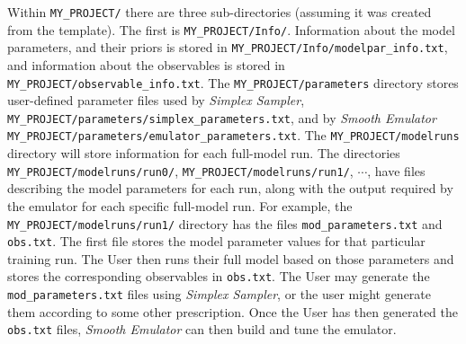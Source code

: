 \documentclass[UserManual.tex]{subfiles}
\begin{document}
Within {\tt MY\_PROJECT/} there are three sub-directories (assuming it was created from the template). The first is {\tt MY\_PROJECT/Info/}. Information about the model parameters, and their priors is stored in {\tt MY\_PROJECT/Info/modelpar\_info.txt}, and information about the observables is stored in {\tt MY\_PROJECT/observable\_info.txt}. The {\tt MY\_PROJECT/parameters} directory stores user-defined parameter files used by {\it Simplex Sampler}, {\tt MY\_PROJECT/parameters/simplex\_parameters.txt}, and by {\it Smooth Emulator} {\tt MY\_PROJECT/parameters/emulator\_parameters.txt}. The {\tt MY\_PROJECT/modelruns} directory will store information for each full-model run. The directories {\tt  MY\_PROJECT/modelruns/run0/}, {\tt  MY\_PROJECT/modelruns/run1/}, $\cdots$, have files describing the model parameters for each run, along with the output required by the emulator for each specific full-model run. For example, the {\tt  MY\_PROJECT/modelruns/run1/} directory has the files {\tt mod\_parameters.txt} and {\tt obs.txt}. The first file stores the model parameter values for that particular training run. The User then runs their full model based on those parameters and stores the corresponding observables in {\tt obs.txt}. The User may generate the {\tt mod\_parameters.txt} files using {\it Simplex Sampler}, or the user might generate them according to some other prescription. Once the User has then generated the {\tt obs.txt} files, {\it Smooth Emulator} can then build and tune the emulator.
\end{document}
